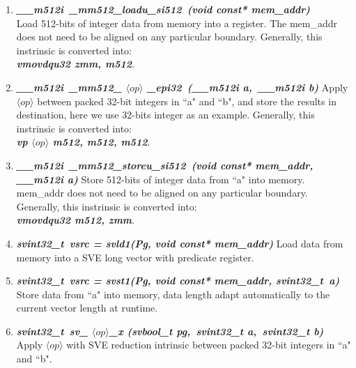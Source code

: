 \documentclass[5p,times,twocolumn]{elsarticle}
\begin{document}
\begin{enumerate}[]%
  \item \emph{\textbf{\textit{\_\_m512i\ \_mm512\_loadu\_si512\ (void const* mem\_addr)}}} \\
  Load 512-bits of integer data from memory into a register. The mem\_addr does not need to be aligned on any particular boundary.
  Generally, this instrinsic is converted into:\\
  \emph{\textbf{\textit{vmovdqu32  zmm,  m512}}}.
  \item \emph{\textbf{\textit{\_\_m512i\ \_mm512\_ $\langle op \rangle$ \_epi32\ (\_\_m512i a,\ \_\_m512i b)}}}
  Apply $\langle op \rangle$ between packed 32-bit integers in ``a" and ``b", and store the results in destination, here we use 32-bits integer as an example.
  Generally, this instrinsic is converted into:\\
  \emph{\textbf{\textit{vp $\langle op \rangle$  m512,  m512,  m512}}}.
  \item \emph{\textbf{\textit{\_\_m512i\ \_mm512\_storeu\_si512\ (void const* mem\_addr,\\ \_\_m512i a)}}}
  Store 512-bits of integer data from ``a" into memory. mem\_addr does not need to be aligned on any particular boundary.
  Generally, this instrinsic is converted into:\\
  \emph{\textbf{\textit{vmovdqu32  m512, zmm}}}.
  \item \emph{\textbf{\textit{svint32\_t\ vsrc = svld1(Pg, void const* mem\_addr)}}}
  Load data from memory into a SVE long vector with predicate register.
  \item \emph{\textbf{\textit{svint32\_t\ vsrc = svst1(Pg, void const* mem\_addr, svint32\_t\ a)}}}
  Store data from ``a" into memory, data length adapt automatically to the current vector length at runtime.
  \item \emph{\textbf{\textit{svint32\_t\ sv_ $\langle op \rangle$\_x (svbool\_t pg,\ svint32\_t a,\ svint32\_t b)}}}
  Apply $\langle op \rangle$ with SVE reduction intrinsic between packed 32-bit integers in ``a" and ``b".
\end{enumerate}
\end{document}
